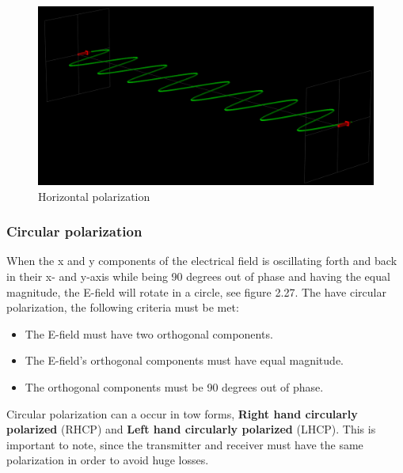 \begin{figure}[h]
\centering
\includegraphics[scale=0.25]{figures/HorizontalPolarization.PNG}
\caption{Horizontal polarization}
\end{figure}

\subsubsection{Circular polarization}
When the x and y components of the electrical field is oscillating forth and back in their x- and y-axis while being 90 degrees out of phase and having the equal magnitude, the E-field will rotate in a circle, see figure 2.27. The have circular polarization, the following criteria  must be met:

\begin{itemize}
  \item The E-field must have two orthogonal components.
  \item The E-field's orthogonal components must have equal magnitude.
  \item The orthogonal components must be 90 degrees out of phase.
\end{itemize}

Circular polarization can a occur in tow forms, \textbf{Right hand circularly polarized} (RHCP) and \textbf{Left hand circularly polarized} (LHCP). This is important to note, since the transmitter and receiver must have the same polarization in order to avoid huge losses. 

